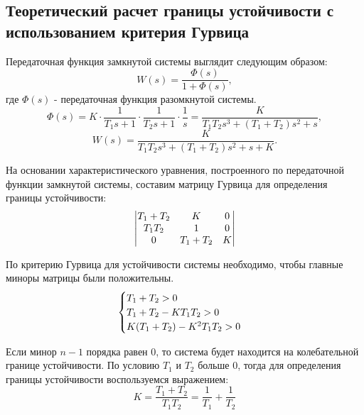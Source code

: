 \documentclass[12pt,a4paper]{article}
\begin{document}
\newpage
\begin{center}
    \section{Теоретический расчет границы устойчивости с использованием критерия Гурвица}
\end{center}
 
 
Передаточная функция замкнутой системы выглядит следующим образом:
\begin{equation} W(s) = \frac{\Phi(s)}{1 + \Phi(s)}, \end{equation}
где $\Phi(s)$ - передаточная функция разомкнутой системы.
\begin{equation} 
\Phi(s) = K\cdot\frac{1}{T_1s + 1}\cdot\frac{1}{T_2s + 1}\cdot\frac{1}{s} = \frac{K}{T_1T_2s^3 + (T_1 + T_2)s^2 +s},
\end{equation}
 \begin{equation} W(s) = \frac{K}{T_1T_2s^3 + (T_1 + T_2)s^2 +s + K}. \end{equation}
\par
На основании характеристического уравнения, построенного по передаточной функции замкнутой системы, составим матрицу Гурвица для определения границы устойчивости:
\[
\begin{vmatrix}
$$T_1 + T_2$$ & $$K$$ & 0\\
$$T_1T_2$$ & 1 & 0\\
0 & $$T_1 + T_2$$ & $$K$$
\end{vmatrix}
\]
\par
По критерию Гурвица для устойчивости системы необходимо, чтобы главные миноры матрицы были положительны. 
\begin{equation}
    \begin{cases}
        $$T_1 + T_2 > 0$$\\
        $$T_1 + T_2 - KT_1T_2 > 0$$\\
        $$K(T_1 + T_2) - K^2T_1T_2 > 0$$
    \end{cases}
\end{equation}
\par
Если минор $n - 1$ порядка равен 0, то система будет находится на колебательной границе устойчивости. По условию $T_1$ и $T_2$ больше 0, тогда для определения границы устойчивости воспользуемся выражением:
\begin{equation}
    K = \frac{T_1 + T_2}{T_1T_2} =  \frac{1}{T_1} + \frac{1}{T_2}
\end{equation}
    
\end{document}
